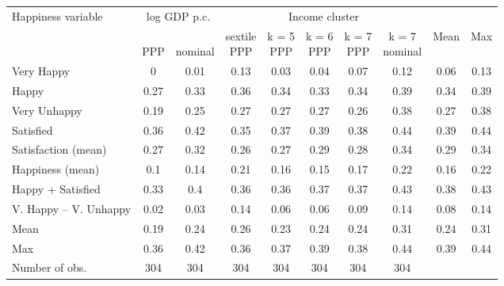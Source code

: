 
\begin{tabular}[t]{lccccccccc}
\toprule Happiness variable & \multicolumn{2}{c}{log GDP p.c.} & \multicolumn{5}{c}{Income cluster} & & \\
  & \makecell{\,\\PPP} & \makecell{\,\\nominal} & \makecell{sextile\\PPP} & \makecell{k = 5\\PPP} & \makecell{k = 6\\PPP} & \makecell{k = 7\\PPP} & \makecell{k = 7\\nominal} & Mean & Max\\
\midrule
Very Happy & 0 & 0.01 & 0.13 & 0.03 & 0.04 & 0.07 & 0.12 & 0.06 & 0.13\\
Happy & 0.27 & 0.33 & 0.36 & 0.34 & 0.33 & 0.34 & 0.39 & 0.34 & 0.39\\
Very Unhappy & 0.19 & 0.25 & 0.27 & 0.27 & 0.27 & 0.26 & 0.38 & 0.27 & 0.38\\
Satisfied & 0.36 & 0.42 & 0.35 & 0.37 & 0.39 & 0.38 & 0.44 & 0.39 & 0.44\\
Satisfaction (mean) & 0.27 & 0.32 & 0.26 & 0.27 & 0.29 & 0.28 & 0.34 & 0.29 & 0.34\\
Happiness (mean) & 0.1 & 0.14 & 0.21 & 0.16 & 0.15 & 0.17 & 0.22 & 0.16 & 0.22\\
Happy + Satisfied & 0.33 & 0.4 & 0.36 & 0.36 & 0.37 & 0.37 & 0.43 & 0.38 & 0.43\\
V. Happy -- V. Unhappy & 0.02 & 0.03 & 0.14 & 0.06 & 0.06 & 0.09 & 0.14 & 0.08 & 0.14\\ \midrule 
Mean & 0.19 & 0.24 & 0.26 & 0.23 & 0.24 & 0.24 & 0.31 & 0.24 & 0.31\\
Max & 0.36 & 0.42 & 0.36 & 0.37 & 0.39 & 0.38 & 0.44 & 0.39 & 0.44\\ \midrule 
Number of obs. & 304 & 304 & 304 & 304 & 304 & 304 & 304 &  & \\
\bottomrule
\end{tabular}